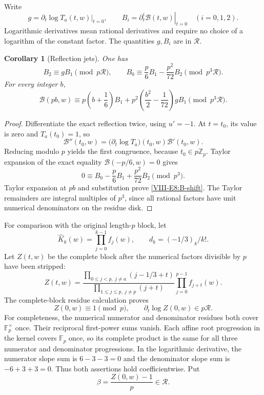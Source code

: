 \documentclass[11pt,letterpaper]{article}
\newtheorem{corollary}[theorem]{Corollary}
\numberwithin{equation}{section}
\begin{document}
Write
\[
 g=\left.\partial_t\log T_a(t,w)\right|_{t=0},\qquad
 B_i=\left.\partial_t^i\mathcal B(t,w)\right|_{t=0}
 \quad (i=0,1,2).
\]
Logarithmic derivatives mean rational derivatives and require no
choice of a logarithm of the constant factor. The quantities $g,B_i$
are in $\mathcal R$.

\begin{corollary}[Reflection jets]\label{VIII-E8:reflection-jets}
One has
\[
 B_2\equiv gB_1\pmod{p\mathcal R},\qquad
 B_0\equiv\frac p6 B_1-\frac{p^2}{72}B_2\pmod{p^3\mathcal R}.
\]
For every integer $b$,
\begin{equation}\label{VIII-E8:B-shift}
 \mathcal B(pb,w)\equiv
 p\left(b+\frac16\right)B_1
 +p^2\left(\frac{b^2}{2}-\frac1{72}\right)gB_1
 \pmod{p^3\mathcal R}.
\end{equation}
\end{corollary}
\begin{proof}
Differentiate the exact reflection twice, using $u'=-1$.
At $t=t_0$, its value is zero and $T_a(t_0)=1$, so
\[
 \mathcal B''(t_0,w)
 =\bigl(\partial_t\log T_a\bigr)(t_0,w)\mathcal B'(t_0,w).
\]
Reducing modulo $p$ yields the first congruence, because $t_0\in p\mathbb Z_p$.
Taylor expansion of the exact equality $\mathcal B(-p/6,w)=0$ gives
\[
 0\equiv B_0-\frac p6B_1+\frac{p^2}{72}B_2\pmod{p^3}.
\]
Taylor expansion at $pb$ and substitution prove \eqref{VIII-E8:B-shift}.
The Taylor remainders are integral multiples of $p^3$, since all
rational factors have unit numerical denominators on the residue disk.
\end{proof}

For comparison with the original length-$p$ block, let
\[
 \widehat K_k(w)=\prod_{j=0}^{k-1}f_j(w),\qquad d_k=(-1/3)_k/k!.
\]
Let $Z(t,w)$ be the complete block after the numerical factors divisible
by $p$ have been stripped:
\[
 Z(t,w)=
 \frac{\prod_{0\le j<p,\ j\ne a}(j-1/3+t)}
 {\prod_{1\le j\le p,\ j\ne p}(j+t)}
 \prod_{j=0}^{p-1}f_{j+t}(w).
\]
The complete-block residue calculation proves
\[
 Z(0,w)\equiv1\pmod p,\qquad
 \partial_t\log Z(0,w)\in p\mathcal R.
\]
For completeness, the numerical numerator and denominator residues
both cover $\mathbb F_p^\times$ once. Their reciprocal first-power
sums vanish. Each affine root progression in the kernel covers
$\mathbb F_p$ once, so its complete product is the same for all three
numerator and denominator progressions. In the logarithmic derivative,
the numerator slope sum is $6-3-3=0$ and the denominator slope sum is
$-6+3+3=0$. Thus both assertions hold coefficientwise.
Put
\[
 \beta=\frac{Z(0,w)-1}{p}\in\mathcal R.
\]
\end{document}
